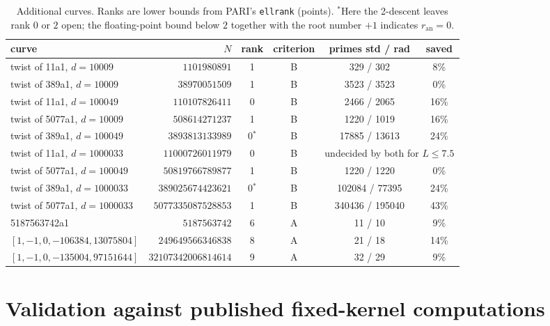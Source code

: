 \documentclass[11pt]{amsart}
\theoremstyle{remark}
\theoremstyle{definition}
\newcommand{\ran}{r_{\mathrm{an}}}
\begin{document}
\begin{table}[h]
\centering\small
\setlength{\tabcolsep}{4.5pt}
\begin{tabular}{lrcccc}
\toprule
curve & $N$ & rank & criterion & primes std / rad & saved\\
\midrule
twist of 11a1, $d=10009$     & $1101980891$         & 1 & B & 329 / 302 & 8\%\\
twist of 389a1, $d=10009$    & $38970051509$        & 1 & B & 3523 / 3523 & 0\%\\
twist of 11a1, $d=100049$    & $110107826411$       & 0 & B & 2466 / 2065 & 16\%\\
twist of 5077a1, $d=10009$   & $508614271237$       & 1 & B & 1220 / 1019 & 16\%\\
twist of 389a1, $d=100049$   & $3893813133989$      & 0$^{\ast}$ & B & 17885 / 13613 & 24\%\\
twist of 11a1, $d=1000033$   & $11000726011979$     & 0 & B & \multicolumn{2}{c}{undecided by both for $L\le7.5$}\\
twist of 5077a1, $d=100049$  & $50819766789877$     & 1 & B & 1220 / 1220 & 0\%\\
twist of 389a1, $d=1000033$  & $389025674423621$    & 0$^{\ast}$ & B & 102084 / 77395 & 24\%\\
twist of 5077a1, $d=1000033$ & $5077335087528853$   & 1 & B & 340436 / 195040 & 43\%\\
\midrule
5187563742a1                 & $5187563742$         & 6 & A & 11 / 10 & 9\%\\
$[1,-1,0,-106384,13075804]$  & $249649566346838$    & 8 & A & 21 / 18 & 14\%\\
$[1,-1,0,-135004,97151644]$  & $32107342006814614$  & 9 & A & 32 / 29 & 9\%\\
\bottomrule
\end{tabular}
\caption{Additional curves. Ranks are lower bounds from PARI's \texttt{ellrank} (points). $^{\ast}$Here the 2-descent leaves rank $0$ or $2$ open; the floating-point bound below $2$ together with the root number $+1$ indicates $\ran=0$.}
\label{tab:big}
\end{table}

\section{Validation against published fixed-kernel computations}\label{sec:valid}
\end{document}
